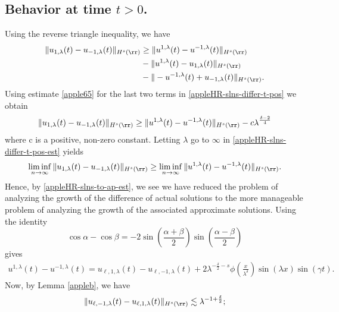\subsection{Behavior at time  $t>0$.}  Using the reverse triangle inequality, we have
%
%
%
\begin{equation} 
	\label{appleHR-slns-differ-t-pos}
	\begin{split}
		\|
		u_{1,\lambda}(t)
		-
		u_{- 1,\lambda}(t)
		\|_{H^s(\rr)}
		&
		\ge
		\|
		u^{1,\lambda}(t)
		-
		u^{- 1,\lambda}(t)
		\|_{H^s(\rr)}
		\\
		&
		-
		\|
		u^{1,\lambda}(t)
		-
		u_{1,\lambda}(t)
		\|_{H^s(\rr)}
		\\
		&
		-
		\|
		-u^{-1,\lambda}(t)
		+
		u_{-1,\lambda}(t)
		\|_{H^s(\rr)} .
	\end{split}
\end{equation}
%
%
Using estimate \eqref{apple65} for the last two terms 
in \eqref{appleHR-slns-differ-t-pos} we obtain
%
%
%
\begin{equation} 
	\label{appleHR-slns-differ-t-pos-est}
	\|
	u_{1,\lambda}(t)
	-
	u_{- 1,\lambda}(t)
	\|_{H^s(\rr)}
	\ge
	\|
	u^{1,\lambda}(t)
	-
	u^{- 1,\lambda}(t)
	\|_{H^s(\rr)}
	-
	c \lambda^{\frac{\delta - 2}{4}}
\end{equation}
where c is a positive, non-zero constant. Letting $\lambda$ go to $\infty$ in
\eqref{appleHR-slns-differ-t-pos-est}
yields
%
\begin{equation} 
	\label{appleHR-slns-to-ap-est}
	\liminf_{n\to\infty}
	\|
	u_{1,\lambda}(t)
	-
	u_{- 1,\lambda}(t)
	\|_{H^s(\rr)}
	\ge
	\liminf_{n\to\infty}
	\|
	u^{1,\lambda}(t)
	-
	u^{- 1,\lambda}(t)
	\|_{H^s(\rr)}.
\end{equation}
%
%
Hence, by \eqref{appleHR-slns-to-ap-est}, we see we have reduced the problem of
analyzing the growth of the difference of actual solutions to the more
manageable problem of analyzing the growth of the associated approximate
solutions. Using the identity 
$$
\cos \alpha -\cos \beta
=
-2
\sin(\frac{\alpha + \beta}{2})
\sin(\frac{\alpha - \beta}{2})
$$
gives
\begin{equation}
	\label{apple80}
	\begin{split}
u^{1,\lambda}(t)
-
u^{- 1,\lambda}(t)
=
u_{\ell,1,\lambda}(t) - u_{\ell,-1,\lambda}(t) + 2\lambda^{-\frac{\delta}{2}-s}
\phi\left( \frac{x}{\lambda^\delta} \right)\sin(\lambda x) \sin(\gamma t).
\end{split}
\end{equation}
Now, by Lemma \ref{appleb}, we have
\begin{equation*}
	\begin{split}
	\|u_{\ell,-1,\lambda}(t) - u_{\ell,1,\lambda}(t)\|_{H^s(\rr)} \lesssim
	\lambda^{-1 + \frac{\delta}{2}};
	\end{split}
\end{equation*}
